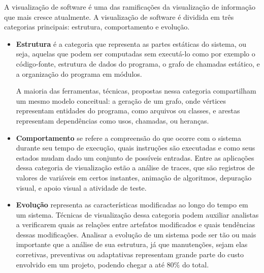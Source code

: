 A visualização de software é uma das ramificações da visualização de informação que mais cresce atualmente. A visualização de software é dividida em três categorias principais: estrutura, comportamento e evolução.
\begin{itemize}
\item \textbf{Estrutura} é a categoria que representa as partes estáticas do sistema, ou seja, aquelas que podem ser computadas sem executá-lo como por exemplo o código-fonte, estrutura de dados do programa, o grafo de chamadas estático, e a organização do programa em módulos.

A maioria das ferramentas, técnicas, propostas nessa categoria compartilham um mesmo modelo conceitual: a geração de um grafo, onde vértices representam entidades do programa, como arquivos ou classes, e arestas representam dependências como usos, chamadas, ou heranças.


\item \textbf{Comportamento} se refere a compreensão do que ocorre com o sistema durante seu tempo de execução, quais instruções são executadas e como seus estados mudam dado um conjunto de possíveis entradas. Entre as aplicações dessa categoria de visualização estão a análise de traces, que são registros de valores de variáveis em certos instantes, animação de algoritmos, depuração visual, e apoio visual a atividade de teste. 

\item \textbf{Evolução} representa as características modificadas ao longo do tempo em um sistema. Técnicas de visualização dessa categoria podem auxiliar analistas a verificarem quais as relações entre artefatos modificados e quais tendências dessas modificações. Analisar a evolução de um sistema pode ser tão ou mais importante que a análise de sua estrutura, já que manutenções, sejam elas corretivas, preventivas ou adaptativas representam grande parte do custo envolvido em um projeto, podendo chegar a até 80\% do total.
\end{itemize}

